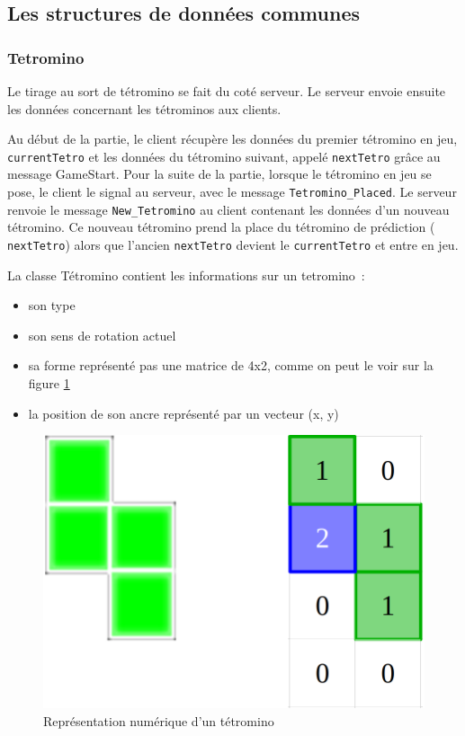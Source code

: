 \documentclass[a4paper, 12pt]{article}
\begin{document}
		\subsection{Les structures de données communes}

		\subsubsection{Tetromino}

			Le tirage au sort de tétromino se fait du coté serveur. Le serveur envoie ensuite les données concernant les tétrominos aux clients.
			
			Au début de la partie, le client récupère les données du premier tétromino en jeu, \texttt{currentTetro} et les données du tétromino suivant, appelé \texttt{nextTetro} grâce au message GameStart.
			Pour la suite de la partie, lorsque le tétromino en jeu se pose, le client le signal au serveur, avec le message \texttt{Tetromino\_Placed}. Le serveur renvoie le message \texttt{New\_Tetromino} au client contenant les données d’un nouveau tétromino. Ce nouveau tétromino prend la place du tétromino de prédiction ( \texttt{nextTetro}) alors que l’ancien \texttt{nextTetro} devient le \texttt{currentTetro} et entre en jeu.

			La classe Tétromino contient les informations sur un tetromino :
			\begin{itemize}
				\item son type
				\item son sens de rotation actuel
				\item sa forme représenté pas une matrice de 4x2, comme on peut le voir sur la figure \ref{fig:ancre}
				\item la position de son ancre représenté par un vecteur (x, y)
			\end{itemize}


			\begin{figure}[bt]
				\centering
				\includegraphics[scale=0.15]{img/ancre.png}
				\caption{Représentation numérique d'un tétromino}
				\label{fig:ancre}
			\end{figure}
\end{document}
